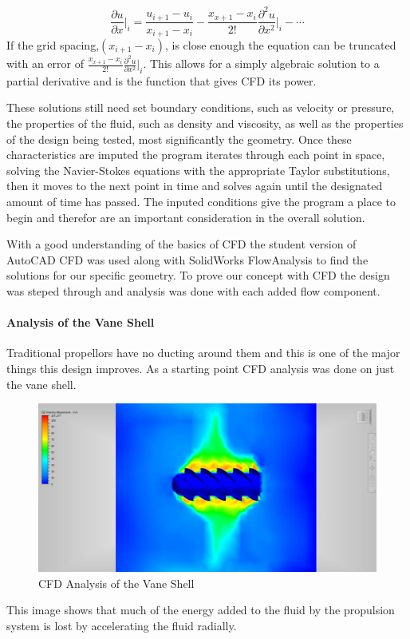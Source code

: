 \documentclass{report}
\begin{document}
\begin{equation}
\frac{\partial{u}}{\partial{x}}\bigg|_i=\frac{u_{i+1}-u_{i}}{x_{i+1}-x_i}-\frac{x_{x+1}-x_i}{2!}\frac{\partial^2u}{\partial x^2}\bigg|_i-\cdots
\end{equation}
If the grid spacing,$(x_{i+1}-x_i)$, is close enough the equation can be truncated with an error of $\frac{x_{x+1}-x_i}{2!}\frac{\partial^2u}{\partial x^2}\big|_i$. This allows for a simply algebraic solution to a partial derivative and is the function that gives CFD its power.\par
These solutions still need set boundary conditions, such as velocity or pressure, the properties of the fluid, such as density and viscosity, as well as the properties of the design being tested, most significantly the geometry. Once these characteristics are imputed the program iterates through each point in space, solving the Navier-Stokes equations with the appropriate Taylor substitutions, then it moves to the next point in time and solves again until the designated amount of time has passed. The inputed conditions give the program a place to begin and therefor are an important consideration in the overall solution.\par
With a good understanding of the basics of CFD the student version of AutoCAD CFD was used along with SolidWorks FlowAnalysis to find the solutions for our specific geometry. To prove our concept with CFD the design was steped through and analysis was done with each added flow component.
\paragraph{Analysis of the Vane Shell}
Traditional propellors have no ducting around them and this is one of the major things this design improves. As a starting point CFD analysis was done on just the vane shell.
\begin{figure}[H]
\centering
\includegraphics[width=12cm]{CFDvs}
\caption{CFD Analysis of the Vane Shell}
\end{figure}
This image shows that much of the energy added to the fluid by the propulsion system is lost by accelerating the fluid radially.
\end{document}
